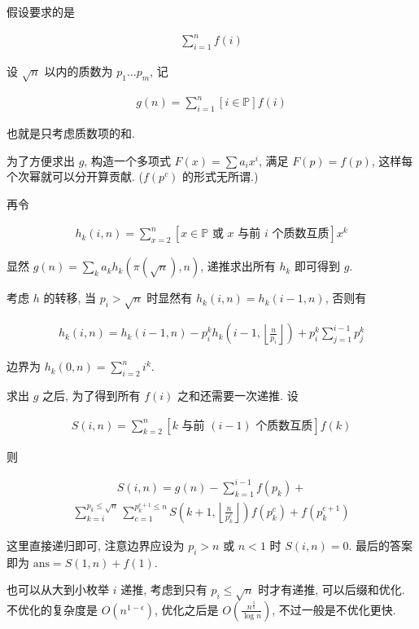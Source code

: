假设要求的是

$$ \begin{aligned} \sum_{i = 1} ^ n f(i) \end{aligned} $$

设 $\sqrt n$ 以内的质数为 $p_1 \dots p_m$, 记

$$ \begin{aligned} g(n) = \sum_{i = 1} ^ n \left[i \in \mathbb{P}\right] f(i) \end{aligned} $$

也就是只考虑质数项的和.

为了方便求出 $g$, 构造一个多项式 $F(x) = \sum a_i x^i$, 满足 $F(p) = f(p)$, 这样每个次幂就可以分开算贡献. ($f(p^c)$ 的形式无所谓.)

再令

$$ \begin{aligned} h_k(i, n) = \sum_{x = 2} ^ n \left[ x \in \mathbb{P} \text{ 或 } x \text{ 与前 } i \text{ 个质数互质} \right] x^k \end{aligned} $$

显然 $g(n) = \sum_k a_k h_k\left( \pi\left(\sqrt n\right), n \right)$, 递推求出所有 $h_k$ 即可得到 $g$.

考虑 $h$ 的转移, 当 $p_i > \sqrt n$ 时显然有 $h_k(i, n) = h_k(i - 1, n)$, 否则有

$$ \begin{aligned} h_k(i, n) =  h_k(i - 1, n) - p_i ^ k h_k\left( i - 1, \left\lfloor \frac n {p_i} \right\rfloor \right) + p_i ^ k \sum_{j = 1} ^ {i - 1} p_j ^ k \end{aligned} $$

边界为 $h_k(0, n) = \sum_{i = 2} ^ n i^k$.

求出 $g$ 之后, 为了得到所有 $f(i)$ 之和还需要一次递推. 设

$$ \begin{aligned} S(i, n) = \sum_{k = 2} ^ n \left[ k \text{ 与前 } (i - 1) \text{ 个质数互质} \right] f(k) \end{aligned}$$

则

$$ \begin{aligned} S(i, n) = g(n) - \sum_{k = 1} ^ {i - 1} f(p_k) + \end{aligned} $$
$$ \begin{aligned} \sum_{k = i} ^ {p_k \le \sqrt n} \sum_{c = 1} ^ {p_k ^ {c + 1} \le n} S\left( k + 1, \left\lfloor \frac n {p_k ^ c} \right\rfloor \right) f\left( p_k ^ c \right) + f\left( p_k ^ {c + 1} \right) \end{aligned} $$

这里直接递归即可, 注意边界应设为 $p_i > n$ 或 $n < 1$ 时 $S(i, n) = 0$. 最后的答案即为 $\text{ans} = S(1, n) + f(1)$.

也可以从大到小枚举 $i$ 递推, 考虑到只有 $p_i \le \sqrt n$ 时才有递推, 可以后缀和优化. 不优化的复杂度是 $O(n^{1 - \epsilon})$, 优化之后是 $O\left( \frac {n^{\frac 3 4}} {\log n} \right)$, 不过一般是不优化更快.

\inputminted{cpp}{../src/numbertheory/min25.cpp}